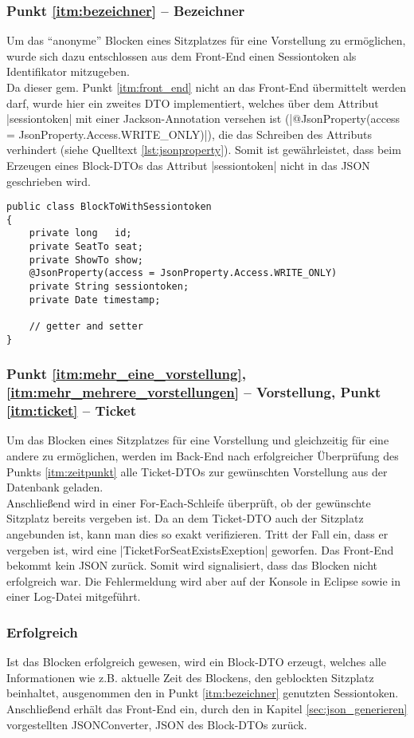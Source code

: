 \subsubsection*{Punkt \ref{itm:bezeichner} -- Bezeichner}
\label{ssssec:Bezeichner}
Um das \enquote{anonyme} Blocken eines Sitzplatzes für eine Vorstellung zu ermöglichen, wurde sich dazu entschlossen aus dem Front-End einen Sessiontoken als Identifikator mitzugeben. \\
Da dieser gem. Punkt \ref{itm:front_end} nicht an das Front-End übermittelt werden darf, wurde hier ein zweites \acs{DTO} implementiert, welches über dem Attribut \jinline|sessiontoken| mit einer Jackson-Annotation 
versehen ist (\jinline|@JsonProperty(access = JsonProperty.Access.WRITE_ONLY)|), die das Schreiben des Attributs verhindert (siehe Quelltext \vref{lst:jsonproperty}). Somit ist gewährleistet, dass beim Erzeugen eines Block-\acp{DTO} das Attribut \jinline|sessiontoken| nicht in das \acs{JSON} geschrieben wird.

\begin{lstlisting}[style=lstJava]
public class BlockToWithSessiontoken
{
	private long   id;
	private SeatTo seat;
	private ShowTo show;
	@JsonProperty(access = JsonProperty.Access.WRITE_ONLY)
	private String sessiontoken;
	private Date timestamp;
		
	// getter and setter
}
\end{lstlisting}
\label{lst:jsonproperty}

\subsubsection*{Punkt \ref{itm:mehr_eine_vorstellung}, \ref{itm:mehr_mehrere_vorstellungen} -- Vorstellung, Punkt \ref{itm:ticket} -- Ticket}
\label{ssssec:Vorstellung}
Um das Blocken eines Sitzplatzes für eine Vorstellung und gleichzeitig für eine andere zu ermöglichen, werden im Back-End nach erfolgreicher Überprüfung des Punkts \ref{itm:zeitpunkt} alle Ticket-\acp{DTO} zur gewünschten Vorstellung aus der Datenbank geladen. \\
Anschließend wird in einer For-Each-Schleife überprüft, ob der gewünschte Sitzplatz bereits vergeben ist. Da an dem Ticket-\acs{DTO} auch der Sitzplatz angebunden ist, kann man dies so exakt verifizieren. Tritt der Fall ein, dass er vergeben ist, wird eine \jinline |TicketForSeatExistsExeption| geworfen. Das Front-End bekommt kein \acs{JSON} zurück. Somit wird signalisiert, dass das Blocken nicht erfolgreich war. Die Fehlermeldung wird aber auf der Konsole in Eclipse sowie in einer Log-Datei mitgeführt. 

\subsubsection*{Erfolgreich}
\label{ssssec:erfolgreich_blocken}
Ist das Blocken erfolgreich gewesen, wird ein Block-\acs{DTO} erzeugt, welches alle Informationen wie z.B. aktuelle Zeit des Blockens, den geblockten Sitzplatz beinhaltet, ausgenommen den in Punkt \ref{itm:bezeichner} genutzten Sessiontoken. Anschließend erhält das Front-End ein, durch den in Kapitel \vref{sec:json_generieren} vorgestellten JSONConverter, \acs{JSON} des Block-\acp{DTO} zurück. 